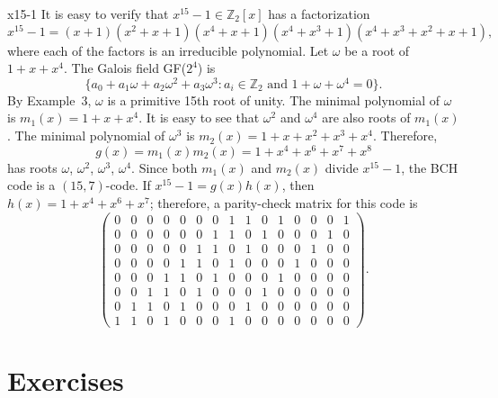 \begin{example}{x15-1}
It is easy to verify that $x^{15} - 1 \in {\mathbb Z}_2[x]$ has a
factorization
\[
x^{15} - 1 = (x + 1)(x^2 + x + 1)(x^4 + x + 1)(x^4 + x^3 + 1)(x^4 +
x^3 + x^2 + x + 1),
\]
where each of the factors is an irreducible polynomial.
Let $\omega$ be a root of $1 + x + x^4$. The Galois field GF($2^4$) is
\[
\{
a_0 + a_1 \omega + a_2 \omega^2 + a_3 \omega^3 : a_i \in {\mathbb Z}_2
\mbox{ and } 1 + \omega + \omega^4 = 0
\}.
\]
By Example~3, $\omega$ is a primitive 15th root of unity. The
minimal polynomial of $\omega$ is $m_1(x) = 1 + x + x^4$. It is easy
to see that $\omega^2$ and $\omega^4$ are also roots of $m_1(x)$. The
minimal polynomial of $\omega^3$ is $m_2(x) = 1 + x + x^2 + x^3 +
x^4$. Therefore, 
\[
g(x) = m_1(x) m_2(x) = 1 + x^4 + x^6 + x^7 + x^8
\]
has roots $\omega$, $\omega^2$, $\omega^3$, $\omega^4$.  Since both $m_1(x)$
and $m_2(x)$ divide $x^{15} - 1$, the BCH code is a $(15, 7)$-code. If
$x^{15} -1 = g(x)h(x)$, then $h(x) = 1 + x^4 + x^6 + x^7$; therefore,
a parity-check matrix for this code is
\[
\left( %
\begin{array}{ccccccccccccccc}
0 & 0 & 0 & 0 & 0 & 0 & 0 & 1 & 1 & 0 & 1 & 0 & 0 & 0 & 1 \\
0 & 0 & 0 & 0 & 0 & 0 & 1 & 1 & 0 & 1 & 0 & 0 & 0 & 1 & 0 \\
0 & 0 & 0 & 0 & 0 & 1 & 1 & 0 & 1 & 0 & 0 & 0 & 1 & 0 & 0 \\
0 & 0 & 0 & 0 & 1 & 1 & 0 & 1 & 0 & 0 & 0 & 1 & 0 & 0 & 0 \\
0 & 0 & 0 & 1 & 1 & 0 & 1 & 0 & 0 & 0 & 1 & 0 & 0 & 0 & 0 \\
0 & 0 & 1 & 1 & 0 & 1 & 0 & 0 & 0 & 1 & 0 & 0 & 0 & 0 & 0 \\
0 & 1 & 1 & 0 & 1 & 0 & 0 & 0 & 1 & 0 & 0 & 0 & 0 & 0 & 0 \\
1 & 1 & 0 & 1 & 0 & 0 & 0 & 1 & 0 & 0 & 0 & 0 & 0 & 0 & 0
\end{array}
\right).
\]
\end{example}


 
\section*{Exercises}
\exrule


